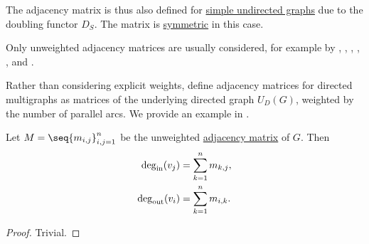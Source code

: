 \begin{comments}
  \item The adjacency matrix is thus also defined for \hyperref[def:undirected_graph]{simple undirected graphs} due to the doubling functor \hyperref[def:graph_functors/simple_doubling]{\( D_S \)}. The matrix is \hyperref[def:transpose_matrix]{symmetric} in this case.

  \item Only unweighted adjacency matrices are usually considered, for example by , , , , ,  and .

  \item Rather than considering explicit weights,  define adjacency matrices for directed multigraphs as matrices of the underlying directed graph \hyperref[def:graph_functors/directed_forgetful]{\( U_D(G) \)}, weighted by the number of parallel arcs. We provide an example in .
\end{comments}

\begin{proposition}\label{thm:adjacency_matrix_degree}
  Let \( M = \seq{ m_{i,j} }_{i,j=1}^n \) be the unweighted \hyperref[def:graph_adjacency_matrix]{adjacency matrix} of \( G \). Then
  \begin{align*}
    \deg_{\op{in}}(v_j)  &= \sum_{k=1}^n m_{k,j}, \\
    \deg_{\op{out}}(v_i) &= \sum_{k=1}^n m_{i,k}.
  \end{align*}
\end{proposition}
\begin{proof}
  Trivial.
\end{proof}

